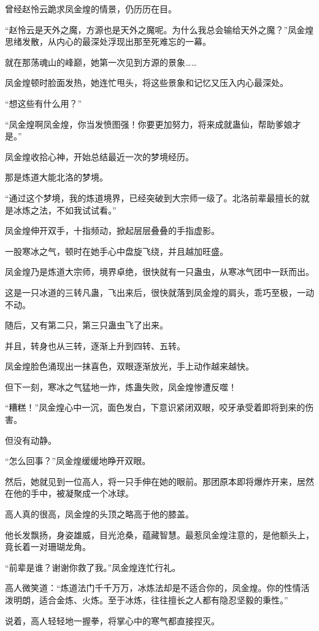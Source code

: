 \begin{this_body}
曾经赵怜云跪求凤金煌的情景，仍历历在目。

“赵怜云是天外之魔，方源也是天外之魔呢。为什么我总会输给天外之魔？”凤金煌思绪发散，从内心的最深处浮现出那至死难忘的一幕。

就在那荡魂山的峰巅，她第一次见到方源的景象……

凤金煌顿时脸面发热，她连忙甩头，将这些景象和记忆又压入内心最深处。

“想这些有什么用？”

“凤金煌啊凤金煌，你当发愤图强！你要更加努力，将来成就蛊仙，帮助爹娘才是。”

凤金煌收拾心神，开始总结最近一次的梦境经历。

那是炼道大能北洛的梦境。

“通过这个梦境，我的炼道境界，已经突破到大宗师一级了。北洛前辈最擅长的就是冰炼之法，不如我试试看。”

凤金煌伸开双手，十指频动，掀起层层叠叠的手指虚影。

一股寒冰之气，顿时在她手心中盘旋飞绕，并且越加旺盛。

凤金煌乃是炼道大宗师，境界卓绝，很快就有一只蛊虫，从寒冰气团中一跃而出。

这是一只冰道的三转凡蛊，飞出来后，很快就落到凤金煌的肩头，乖巧至极，一动不动。

随后，又有第二只，第三只蛊虫飞了出来。

并且，转身也从三转，逐渐上升到四转、五转。

凤金煌脸色涌现出一抹喜色，双眼逐渐放光，手上动作越来越快。

但下一刻，寒冰之气猛地一炸，炼蛊失败，凤金煌惨遭反噬！

“糟糕！”凤金煌心中一沉，面色发白，下意识紧闭双眼，咬牙承受着即将到来的伤害。

但没有动静。

“怎么回事？”凤金煌缓缓地睁开双眼。

然后，她就见到一位高人，将一只手伸在她的眼前。那团原本即将爆炸开来，居然在他的手中，被凝聚成一个冰球。

高人真的很高，凤金煌的头顶之略高于他的膝盖。

他长发飘扬，身姿雄威，目光沧桑，蕴藏智慧。最惹凤金煌注意的，是他额头上，竟长着一对珊瑚龙角。

“前辈是谁？谢谢你救了我。”凤金煌连忙行礼。

高人微笑道：“炼道法门千千万万，冰炼法却是不适合你的，凤金煌。你的性情活泼明朗，适合金炼、火炼。至于冰炼，往往擅长之人都有隐忍坚毅的秉性。”

说着，高人轻轻地一握拳，将掌心中的寒气都直接捏灭。


\end{this_body}
